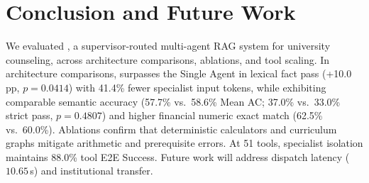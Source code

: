 \section{Conclusion and Future Work}
\label{sec:conclusion}

We evaluated \system{}, a supervisor-routed multi-agent RAG system for university counseling, across architecture comparisons, ablations, and tool scaling. In architecture comparisons, \system{} surpasses the Single Agent in lexical fact pass (+10.0\,pp, $p{=}0.0414$) with 41.4\% fewer specialist input tokens, while exhibiting comparable semantic accuracy (57.7\% vs.\ 58.6\% Mean AC; 37.0\% vs.\ 33.0\% strict pass, $p{=}0.4807$) and higher financial numeric exact match (62.5\% vs.\ 60.0\%). Ablations confirm that deterministic calculators and curriculum graphs mitigate arithmetic and prerequisite errors. At 51 tools, specialist isolation maintains 88.0\% tool E2E Success. Future work will address dispatch latency ($10.65$\,s) and institutional transfer.
